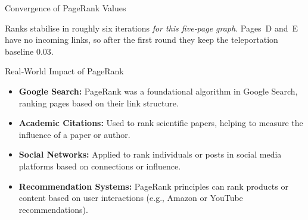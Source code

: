 \documentclass{beamer}
\begin{document}
\begin{frame}{Convergence of PageRank Values}
\centering
{}

\vspace{0.35em}
\small
Ranks stabilise in roughly six iterations \emph{for this five‑page graph}.  Pages~D and~E have no incoming links, so after the first round they keep the teleportation baseline $0.03$.
\end{frame}

\begin{frame}{Real‑World Impact of PageRank}
\begin{itemize}
  \item \textbf{Google Search:} PageRank was a foundational algorithm in Google Search, ranking pages based on their link structure.
  \item \textbf{Academic Citations:} Used to rank scientific papers, helping to measure the influence of a paper or author.
  \item \textbf{Social Networks:} Applied to rank individuals or posts in social media platforms based on connections or influence.
  \item \textbf{Recommendation Systems:} PageRank principles can rank products or content based on user interactions (e.g., Amazon or YouTube recommendations).
\end{itemize}
\end{frame}
\end{document}
